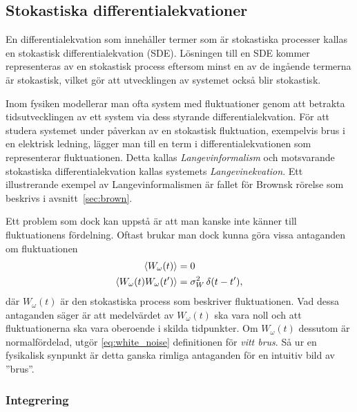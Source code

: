 \subsection{Stokastiska differentialekvationer}
En differentialekvation som innehåller termer som är stokastiska
processer kallas en stokastisk differentialekvation (SDE). Lösningen
till en SDE kommer representeras av en stokastisk process eftersom
minst en av de ingående termerna är stokastisk, vilket gör att
utvecklingen av systemet också blir stokastisk. 
 
Inom fysiken modellerar man ofta system med fluktuationer genom
att betrakta tidsutvecklingen av ett system via dess styrande
differentialekvation. 
För att studera systemet under påverkan av en stokastisk fluktuation,
exempelvis brus i en elektrisk ledning, lägger man till en term i
differentialekvationen som representerar fluktuationen. 
Detta kallas \emph{Langevinformalism} och motsvarande stokastiska
differentialekvation kallas systemets \emph{Langevinekvation}. 
Ett illustrerande exempel av Langevinformalismen är fallet för
Brownsk rörelse som beskrivs i avsnitt~\ref{sec:brown}.

Ett problem som dock kan uppstå är att man kanske inte känner till
fluktuationens fördelning. Oftast brukar man dock kunna göra vissa
antaganden om fluktuationen
\begin{equation}\label{eq:white_noise}
\begin{aligned}
\ev{W_\omega(t)}&=0 \\
\ev{W_\omega(t)W_\omega(t')}&= \sigma_W^2 \, \delta(t-t'), \\
\end{aligned}
\end{equation}
där $W_\omega(t)$ är den stokastiska process som beskriver
fluktuationen. Vad dessa antaganden säger är att medelvärdet av
$W_\omega(t)$ ska vara noll och att fluktuationerna ska vara oberoende
i skilda tidpunkter. Om $W_\omega(t)$ dessutom är normalfördelad,
utgör \eqref{eq:white_noise}  definitionen för
\emph{vitt brus}. Så ur en fysikalisk synpunkt är detta ganska rimliga
antaganden för en intuitiv bild av ''brus''. 

\subsubsection{Integrering}





